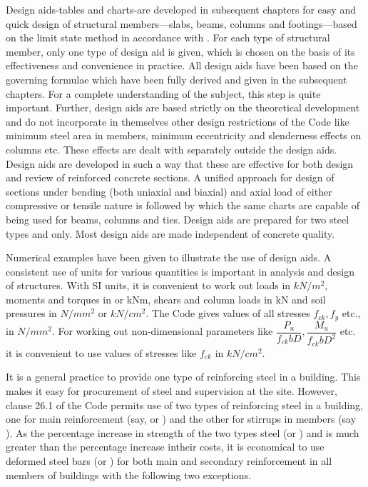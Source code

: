Design aids-tables and charts-are developed in subsequent chapters for
easy and quick design of structural members—slabs, beams, columns and
footings—based on the limit state method in accordance with
. For each type of structural member, only
one type of design aid is given, which is chosen on the basis of its
effectiveness and convenience in practice. All design aids have been 
based on the governing formulae which have been fully derived and given
in the subsequent chapters. For a complete understanding of the subject,
this step is quite important. Further, design aids are based strictly
on the theoretical development and do not incorporate in themselves other
design restrictions of the Code like minimum steel area in members, minimum
eccentricity and slenderness effects on columns etc. These effects are
dealt with separately outside the design aids. Design aids are developed
in such a way that these are effective for both design and review of
reinforced concrete sections. A unified approach for design of sections
under bending (both uniaxial and biaxial) and axial load of either
compressive or tensile nature is followed by which the same charts are
capable of being used for beams, columns and ties. Design aids are
prepared for two steel types {\fetwofivezero} and {\fefouronefive} only.
Most design aids are made independent of concrete quality.

Numerical examples have been given to illustrate the use of design aids.
A consistent use of units for various quantities is important in analysis
and design of structures. With SI units, it is convenient to work out
loads in $kN/m^2$, moments and torques in or kNm, shears and column
loads in kN and soil pressures in $N/mm^2$ or $kN/cm^2$. The Code
gives values of all stresses $f_{ck}, f_y$ etc., in $N/mm^2$. For working
out non-dimensional parameters like
$\dfrac{P_u}{f_{ck}bD},\dfrac{M_u}{f_{ck}bD^2}$ etc. it is convenient to
use values of stresses like $f_{ck}$ in $kN/cm^2$.


It is a general practice to provide one type of reinforcing steel in a
building. This makes it easy for procurement of steel and supervision 
at the site. However, clause 26.1 of the Code permits use of two types
of reinforcing steel in a building, one for main reinforcement (say,
{\fefouronefive} or {\fefivezerozero}) and the other for stirrups in members
(say {\fetwofivezero}).
As the percentage increase in strength of the two types steel
\fefouronefive
(or {\fefivezerozero}) and {\fetwofivezero} is much greater than the
percentage increase intheir costs, it is economical to use deformed steel
bars {\fefouronefive} (or \fefivezerozero) for both main and secondary
reinforcement in all members of buildings with the following two exceptions.

